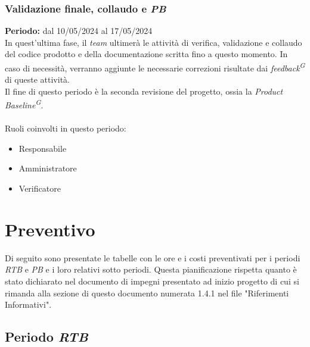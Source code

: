 \documentclass[5pt]{article}
\begin{document}
    \subsubsection{Validazione finale, collaudo e \textit{PB}}
      \textbf{Periodo:} dal 10/05/2024 al 17/05/2024 
      \vspace{0.3cm}\\
      In quest'ultima fase, il \textit{team} ultimerà le attività di verifica, validazione e collaudo del codice prodotto e della documentazione scritta fino a questo momento.
      In caso di necessità, verranno aggiunte le necessarie correzioni risultate dai \textit{feedback\textsuperscript{G}} di queste attività. \\
      Il fine di questo periodo è la seconda revisione del progetto, ossia la \textit{Product Baseline\textsuperscript{G}}.\\\\
      Ruoli coinvolti in questo periodo:
      \begin{itemize}
          \item Responsabile
          \item Amministratore
          \item Verificatore
      \end{itemize}

\section{Preventivo}
  Di seguito sono presentate le tabelle con le ore e i costi preventivati per i periodi \textit{RTB} e \textit{PB} e i loro relativi sotto periodi.
  Questa pianificazione rispetta quanto è stato dichiarato nel documento di impegni presentato ad inizio progetto di cui si rimanda alla sezione di questo documento numerata 1.4.1 nel file "Riferimenti Informativi".

  \subsection{Periodo \textit{RTB}}
\end{document}
